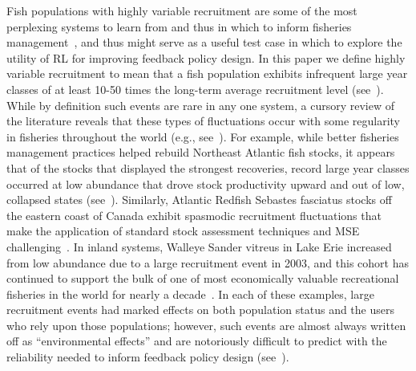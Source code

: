 \documentclass[floatfix,nofootinbib,longbibliography,notitlepage]{revtex4-1}
\def\eg{e.g.}
\begin{document}
Fish populations with highly variable recruitment are some of the most perplexing systems to learn from and thus in which to inform fisheries management~\cite{hjort1914,caddy-gulland}, and thus might serve as a useful test case in which to explore the utility of RL for improving feedback policy design.  
In this paper we define highly variable recruitment to mean that a fish population exhibits infrequent large year classes of at least 10-50 times the long-term average recruitment level (see~\cite{caddy-gulland}).  
While by definition such events are rare in any one system, a cursory review of the literature reveals that these types of fluctuations occur with some regularity in fisheries throughout the world (\eg, see~\cite{fisch-etal-2019,licandeo-etal-2020}).  
For example, while better fisheries management practices helped rebuild Northeast Atlantic fish stocks, it appears that of the stocks that displayed the strongest recoveries, record large year classes occurred at low abundance that drove stock productivity upward and out of low, collapsed states (see~\cite{zimmermann2019improved}).  
Similarly, Atlantic Redfish Sebastes fasciatus stocks off the eastern coast of Canada exhibit spasmodic recruitment fluctuations that make the application of standard stock assessment techniques and MSE challenging~\cite{licandeo-etal-2020}.  
In inland systems, Walleye Sander vitreus in Lake Erie increased from low abundance due to a large recruitment event in 2003, and this cohort has continued to support the bulk of one of most economically valuable recreational fisheries in the world for nearly a decade~\cite{schmitt-vandergoot}.  
In each of these examples, large recruitment events had marked effects on both population status and the users who rely upon those populations; however, such events are almost always written off as “environmental effects” and are notoriously difficult to predict with the reliability needed to inform feedback policy design (see~\cite{punt2014, myers1998}).  
	
\end{document}
